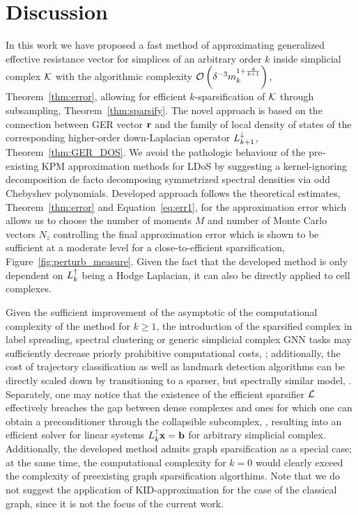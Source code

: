 \section{ Discussion }
\label{sec:discussion}

In this work we have proposed a fast method of approximating generalized effective resistance vector for simplices of an arbitrary order \( k \) inside simplicial complex \( \mathcal{K} \) with the algorithmic complexity \( \mathcal{O} \left( \delta^{-3} m_k^{ 1 + \frac{4}{k+1}} \right)\), Theorem~\ref{thm:error}, allowing for efficient \( k\)-sparsification of \( \mathcal{K} \) through subsampling, Theorem~\ref{thm:sparsify}. The novel approach is based on the connection between GER vector \( \mathbf{r} \) and the family of local density of states of the corresponding higher-order down-Laplacian operator \( L_{k+1}^{\downarrow}\), Theorem~\ref{thm:GER_DOS}. We avoid the pathologic behaviour of the pre-existing KPM approximation methods for LDoS by suggesting a kernel-ignoring decomposition de facto decomposing symmetrized spectral densities via odd Chebyshev polynomials. Developed approach follows the theoretical estimates, Theorem~\ref{thm:error} and Equation~\eqref{eq:err1}, for the approximation error which allows us to choose the number of moments \( M \) and number of Monte Carlo vectors \( N_z \) controlling the final approximation error which is shown to be sufficient at a moderate level for a close-to-efficient sparsification, Figure~\ref{fig:perturb_measure}. Given the fact that the developed method is only dependent on \( L_{k}^{\uparrow} \) being a Hodge Laplacian, it can also be directly applied to cell complexes.

Given the sufficient improvement of the asymptotic of the computational complexity of the method for \(k \ge 1 \), the introduction of the sparsified complex in label spreading, spectral clustering or generic simplicial complex GNN tasks may sufficiently decrease priorly prohibitive computational costs, \cite{yang2022simplicial,ebli2019notion}; additionally, the cost of trajectory classification as well as landmark detection algorithms can be directly scaled down by transitioning to a sparser, but spectrally similar model, \cite{grande2024topological}. Separately, one may notice that the existence of the efficient sparsifier \( \mathcal{L} \) effectively breaches the gap between dense complexes and ones for which one can obtain a preconditioner through the collapsible subcomplex, \cite{savostianov2024cholesky}, resulting into an efficient solver for linear systems \( L_{k}^{\uparrow} \mathbf{x} = \mathbf{b} \) for arbitrary simplicial complex. Additionally, the developed method admits graph sparsification as a special case; at the same time, the computational complexity for \( k = 0 \) would clearly exceed the complexity of preexisting graph sparsification algorthims. Note that we do not suggest the application of KID-approximation for the case of the classical graph, since it is not the focus of the current work.

